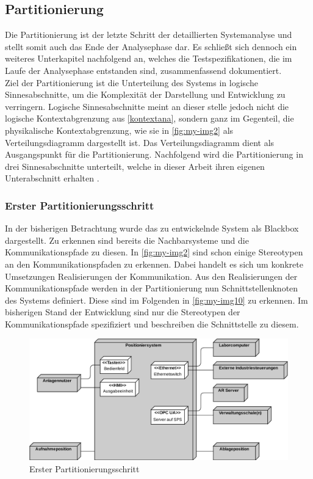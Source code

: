 \documentclass[../../../Bachelorarbeit.tex]{subfiles}
\begin{document}
\subsection{Partitionierung}
Die Partitionierung ist der letzte Schritt der detaillierten Systemanalyse und stellt somit auch das Ende der Analysephase dar. Es schließt sich dennoch ein weiteres Unterkapitel nachfolgend an, welches die Testspezifikationen, die im Laufe der Analysephase entstanden sind, zusammenfassend dokumentiert. \\
Ziel der Partitionierung ist die Unterteilung des Systems in logische Sinnesabschnitte, um die Komplexität der Darstellung und Entwicklung zu verringern. Logische Sinnesabschnitte meint an dieser stelle jedoch nicht die logische Kontextabgrenzung aus \autoref{kontextana}, sondern ganz im Gegenteil, die physikalische Kontextabgrenzung, wie sie in \autoref{fig:my-img2} als Verteilungsdiagramm dargestellt ist. Das Verteilungsdiagramm dient als Ausgangspunkt für die Partitionierung. Nachfolgend wird die Partitionierung in drei Sinnesabschnitte unterteilt, welche in dieser Arbeit ihren eigenen Unterabschnitt erhalten \cite[274]{Tabeling2006}. \\

\subsubsection{Erster Partitionierungsschritt}
In der bisherigen Betrachtung wurde das zu entwickelnde System als Blackbox dargestellt. Zu erkennen sind bereits die Nachbarsysteme und die Kommunikationspfade zu diesen. In \autoref{fig:my-img2} sind schon einige Stereotypen an den Kommunikationspfaden zu erkennen. Dabei handelt es sich um konkrete Umsetzungen \bzw Realisierungen der Kommunikation. Aus den Realisierungen der Kommunikationspfade werden in der Partitionierung nun Schnittstellenknoten des Systems definiert. Diese sind im Folgenden in \autoref{fig:my-img10} zu erkennen. Im bisherigen Stand der Entwicklung sind nur die Stereotypen der Kommunikationspfade spezifiziert und beschreiben die Schnittstelle zu diesem. 

\begin{figure}[H]
    \centering
    \includegraphics[width=\textwidth]{Images/erster_schritt.pdf}
    \caption[Erster Partitionierungsschritt]{Erster Partitionierungsschritt}
    \label{fig:my-img10}
\end{figure}
\end{document}
